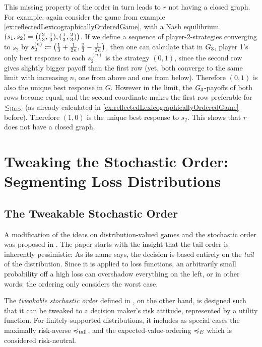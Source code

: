 \documentclass[a4paper]{scrreprt}
\begin{document}
    This missing property of the order in turn leads to $r$ not having a closed graph. For example, again consider the game from example \ref{ex:reflectedLexicographicallyOrderedGame}, with a Nash equilibrium $(s_1, s_2) = \left((\frac{2}{3}, \frac{1}{3}), (\frac{1}{3}, \frac{2}{3})\right)$.
    If we define a sequence of player-2-strategies converging to $s_2$ by $s_2^{(n)} \coloneqq \left(\frac{1}{3} + \frac{1}{2n}, \frac{2}{3} - \frac{1}{2n}\right)$, then one can calculate that in $G_{3}$, player 1's only best response to each $s_2^{(n)}$ is the strategy $(0, 1)$, since the second row gives slightly bigger payoff than the first row (yet, both converge to the same limit with increasing $n$, one from above and one from below). Therefore $(0, 1)$ is also the unique best response in $G$.
    However in the limit, the $G_{3}$-payoffs of both rows become equal, and the second coordinate makes the first row preferable for $\leq_{\textsc{Rlex}}$ (as already calculated in \ref{ex:reflectedLexicographicallyOrderedGame} before). Therefore $(1, 0)$ is the unique best response to $s_2$. This shows that $r$ does not have a closed graph.
    
    \chapter{Tweaking the Stochastic Order: Segmenting Loss Distributions}
    \newcommand{\Fab}{\mathfrak{F}_{[a, b]}} %
    
    \section{The Tweakable Stochastic Order}
    A modification of the ideas on distribution-valued games and the stochastic order was proposed in \cite{bib:tweakableStochasticOrders}.
    The paper starts with the insight that the tail order is inherently pessimistic: As its name says, the decision is based entirely on the \emph{tail} of the distribution. Since it is applied to loss functions, an arbitrarily small probability off a high loss can overshadow everything on the left, or in other words: the ordering only considers the worst case.
        
    The \emph{tweakable stochastic order} defined in \cite{bib:tweakableStochasticOrders}, on the other hand,
    is designed such that it can be tweaked to a decision maker's risk attitude, represented by a utility function.
    For finitely-supported distributions, it includes as special cases the maximally risk-averse $\preccurlyeq_{\text{tail}}$, and the expected-value-ordering $\preccurlyeq_E$ which is considered risk-neutral.
    
\end{document}

